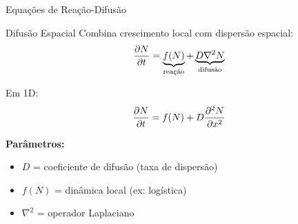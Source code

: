 \begin{frame}{Equações de Reação-Difusão}
\begin{block}{Difusão Espacial}
Combina crescimento local com dispersão espacial:
\begin{equation*}
\frac{\partial N}{\partial t} = \underbrace{f(N)}_{\text{reação}} + \underbrace{D\nabla^2 N}_{\text{difusão}}
\end{equation*}

Em 1D:
\begin{equation*}
\frac{\partial N}{\partial t} = f(N) + D\frac{\partial^2 N}{\partial x^2}
\end{equation*}
\end{block}

\textbf{Parâmetros:}
\begin{itemize}
    \item $D$ = coeficiente de difusão (taxa de dispersão)
    \item $f(N)$ = dinâmica local (ex: logística)
    \item $\nabla^2$ = operador Laplaciano
\end{itemize}

\end{frame}

